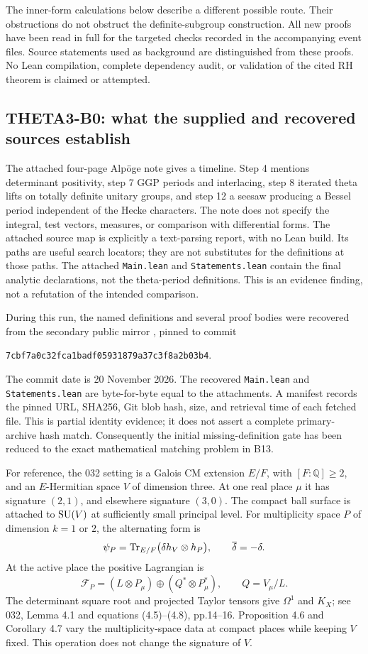 \documentclass[11pt]{article}
\newcommand{\Q}{\mathbb Q}\newcommand{\C}{\mathbb C}\newcommand{\Z}{\mathbb Z}\newcommand{\R}{\mathbb R}\newcommand{\A}{\mathbb A}\newcommand{\OO}{\mathcal O}
\theoremstyle{definition}\newtheorem{definition}[theorem]{Definition}\newtheorem{remark}[theorem]{Remark}
\begin{document}
The inner-form calculations below describe a different possible route. Their obstructions do not obstruct the definite-subgroup construction. All new proofs have been read in full for the targeted checks recorded in the accompanying event files. Source statements used as background are distinguished from these proofs. No Lean compilation, complete dependency audit, or validation of the cited RH theorem is claimed or attempted.

\subsection{THETA3-B0: what the supplied and recovered sources establish}\label{B0}

The attached four-page Alp\"oge note gives a timeline. Step 4 mentions determinant positivity, step 7 GGP periods and interlacing, step 8 iterated theta lifts on totally definite unitary groups, and step 12 a seesaw producing a Bessel period independent of the Hecke characters. The note does not specify the integral, test vectors, measures, or comparison with differential forms. The attached source map is explicitly a text-parsing report, with no Lean build. Its paths are useful search locators; they are not substitutes for the definitions at those paths. The attached \texttt{Main.lean} and \texttt{Statements.lean} contain the final analytic declarations, not the theta-period definitions. This is an evidence finding, not a refutation of the intended comparison.

During this run, the named definitions and several proof bodies were recovered from the secondary public mirror , pinned to commit
\begin{center}\small\nolinkurl{7cbf7a0c32fca1badf05931879a37c3f8a2b03b4}.\end{center}
The commit date is 20 November 2026. The recovered \texttt{Main.lean} and \texttt{Statements.lean} are byte-for-byte equal to the attachments. A manifest records the pinned URL, SHA256, Git blob hash, size, and retrieval time of each fetched file. This is partial identity evidence; it does not assert a complete primary-archive hash match. Consequently the initial missing-definition gate has been reduced to the exact mathematical matching problem in B13.

For reference, the 032 setting is a Galois CM extension $E/F$, with $[F:\Q]\geq2$, and an $E$-Hermitian space $V$ of dimension three. At one real place $\mu$ it has signature $(2,1)$, and elsewhere signature $(3,0)$. The compact ball surface is attached to $\operatorname{SU}(V)$ at sufficiently small principal level. For multiplicity space $P$ of dimension $k=1$ or $2$, the alternating form is
\[
 \psi_P=\operatorname{Tr}_{E/F}\bigl(\delta h_V\otimes h_P\bigr),
 \qquad \overline\delta=-\delta.
\]
At the active place the positive Lagrangian is
\[
 \mathcal F_P=(L\otimes P_\mu)\oplus(Q^*\otimes P_\mu^*),
 \qquad Q=V_\mu/L.
\]
The determinant square root and projected Taylor tensors give $\Omega^1$ and $K_X$; see 032, Lemma 4.1 and equations (4.5)--(4.8), pp.14--16. Proposition 4.6 and Corollary 4.7 vary the multiplicity-space data at compact places while keeping $V$ fixed. This operation does not change the signature of $V$.
\end{document}
